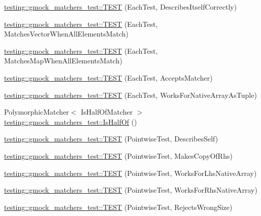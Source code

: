 \begin{DoxyCompactItemize}
\item 
\hyperlink{namespacetesting_1_1gmock__matchers__test_a183c4b7acec060c6fe3dee650bc97e6d}{testing\+::gmock\+\_\+matchers\+\_\+test\+::\+T\+E\+ST} (Each\+Test, Describes\+Itself\+Correctly)
\item 
\hyperlink{namespacetesting_1_1gmock__matchers__test_a1310e7e85bf8ea8f2281850167e15465}{testing\+::gmock\+\_\+matchers\+\_\+test\+::\+T\+E\+ST} (Each\+Test, Matches\+Vector\+When\+All\+Elements\+Match)
\item 
\hyperlink{namespacetesting_1_1gmock__matchers__test_a53e7c1a04b8f178af52eeaa9f190cb64}{testing\+::gmock\+\_\+matchers\+\_\+test\+::\+T\+E\+ST} (Each\+Test, Matches\+Map\+When\+All\+Elements\+Match)
\item 
\hyperlink{namespacetesting_1_1gmock__matchers__test_a74f7c802ddb6879d3c76ff08d3e242b9}{testing\+::gmock\+\_\+matchers\+\_\+test\+::\+T\+E\+ST} (Each\+Test, Accepts\+Matcher)
\item 
\hyperlink{namespacetesting_1_1gmock__matchers__test_aef6eeafb03f698d16206836bbb6f05b9}{testing\+::gmock\+\_\+matchers\+\_\+test\+::\+T\+E\+ST} (Each\+Test, Works\+For\+Native\+Array\+As\+Tuple)
\item 
Polymorphic\+Matcher$<$ Is\+Half\+Of\+Matcher $>$ \hyperlink{namespacetesting_1_1gmock__matchers__test_ace0a8f64b108c7a9c32c2cac15185461}{testing\+::gmock\+\_\+matchers\+\_\+test\+::\+Is\+Half\+Of} ()
\item 
\hyperlink{namespacetesting_1_1gmock__matchers__test_a2c4c39058405e13e6c6b7fcf8e6bfe43}{testing\+::gmock\+\_\+matchers\+\_\+test\+::\+T\+E\+ST} (Pointwise\+Test, Describes\+Self)
\item 
\hyperlink{namespacetesting_1_1gmock__matchers__test_a9be60ebc74e280d7eb6668bfa316a765}{testing\+::gmock\+\_\+matchers\+\_\+test\+::\+T\+E\+ST} (Pointwise\+Test, Makes\+Copy\+Of\+Rhs)
\item 
\hyperlink{namespacetesting_1_1gmock__matchers__test_ad0e797104a482eba2d6c137cf9b676a5}{testing\+::gmock\+\_\+matchers\+\_\+test\+::\+T\+E\+ST} (Pointwise\+Test, Works\+For\+Lhs\+Native\+Array)
\item 
\hyperlink{namespacetesting_1_1gmock__matchers__test_adabf6a3ceda0024d630d2ece31e37f7c}{testing\+::gmock\+\_\+matchers\+\_\+test\+::\+T\+E\+ST} (Pointwise\+Test, Works\+For\+Rhs\+Native\+Array)
\item 
\hyperlink{namespacetesting_1_1gmock__matchers__test_a1f73a8fa9dd9560bd606a990444a81fe}{testing\+::gmock\+\_\+matchers\+\_\+test\+::\+T\+E\+ST} (Pointwise\+Test, Rejects\+Wrong\+Size)

\end{DoxyCompactItemize}
